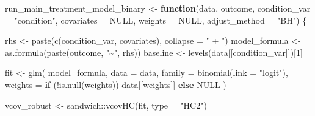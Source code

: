 \documentclass[
  letterpaper,
  DIV=11,
  numbers=noendperiod]{scrartcl}
\newenvironment{Shaded}{\begin{snugshade}}{\end{snugshade}}
\newcommand{\AttributeTok}[1]{\textcolor[rgb]{0.40,0.45,0.13}{#1}}
\newcommand{\ConstantTok}[1]{\textcolor[rgb]{0.56,0.35,0.01}{#1}}
\newcommand{\ControlFlowTok}[1]{\textcolor[rgb]{0.00,0.23,0.31}{\textbf{#1}}}
\newcommand{\DecValTok}[1]{\textcolor[rgb]{0.68,0.00,0.00}{#1}}
\newcommand{\FunctionTok}[1]{\textcolor[rgb]{0.28,0.35,0.67}{#1}}
\newcommand{\NormalTok}[1]{\textcolor[rgb]{0.00,0.23,0.31}{#1}}
\newcommand{\OtherTok}[1]{\textcolor[rgb]{0.00,0.23,0.31}{#1}}
\newcommand{\SpecialCharTok}[1]{\textcolor[rgb]{0.37,0.37,0.37}{#1}}
\newcommand{\StringTok}[1]{\textcolor[rgb]{0.13,0.47,0.30}{#1}}
\begin{document}
\begin{Shaded}
\begin{Highlighting}[]
\NormalTok{run\_main\_treatment\_model\_binary }\OtherTok{\textless{}{-}} \ControlFlowTok{function}\NormalTok{(data,}
\NormalTok{                                            outcome,}
                                            \AttributeTok{condition\_var =} \StringTok{"condition"}\NormalTok{,}
                                            \AttributeTok{covariates    =} \ConstantTok{NULL}\NormalTok{,}
                                            \AttributeTok{weights       =} \ConstantTok{NULL}\NormalTok{,}
                                            \AttributeTok{adjust\_method =} \StringTok{"BH"}\NormalTok{) \{}
  
\NormalTok{  rhs           }\OtherTok{\textless{}{-}} \FunctionTok{paste}\NormalTok{(}\FunctionTok{c}\NormalTok{(condition\_var, covariates), }\AttributeTok{collapse =} \StringTok{" + "}\NormalTok{)}
\NormalTok{  model\_formula }\OtherTok{\textless{}{-}} \FunctionTok{as.formula}\NormalTok{(}\FunctionTok{paste}\NormalTok{(outcome, }\StringTok{"\textasciitilde{}"}\NormalTok{, rhs))}
\NormalTok{  baseline      }\OtherTok{\textless{}{-}} \FunctionTok{levels}\NormalTok{(data[[condition\_var]])[}\DecValTok{1}\NormalTok{]}
  
\NormalTok{  fit }\OtherTok{\textless{}{-}} \FunctionTok{glm}\NormalTok{(}
\NormalTok{    model\_formula,}
    \AttributeTok{data    =}\NormalTok{ data,}
    \AttributeTok{family  =} \FunctionTok{binomial}\NormalTok{(}\AttributeTok{link =} \StringTok{"logit"}\NormalTok{),}
    \AttributeTok{weights =} \ControlFlowTok{if}\NormalTok{ (}\SpecialCharTok{!}\FunctionTok{is.null}\NormalTok{(weights)) data[[weights]] }\ControlFlowTok{else} \ConstantTok{NULL}
\NormalTok{  )}
  
\NormalTok{  vcov\_robust }\OtherTok{\textless{}{-}}\NormalTok{ sandwich}\SpecialCharTok{::}\FunctionTok{vcovHC}\NormalTok{(fit, }\AttributeTok{type =} \StringTok{"HC2"}\NormalTok{)}
  

\end{Highlighting}
\end{Shaded}
\end{document}
